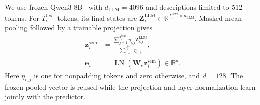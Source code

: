 \documentclass[journal]{IEEEtran}
\begin{document}
We use frozen Qwen3-8B~\cite{qwen2025technicalreport} with $d_{\mathrm{LLM}}=4096$ and descriptions limited to 512 tokens. For $T_i^{\mathrm{text}}$ tokens, its final states are $\mathbf Z_i^{\mathrm{LLM}}\in\mathbb R^{T_i^{\mathrm{text}}\times d_{\mathrm{LLM}}}$. Masked mean pooling followed by a trainable projection gives
\begin{equation}
\label{eq:semantic-representation}
\begin{aligned}
\mathbf z_i^{\mathrm{sem}}
&=\frac{\sum_{j=1}^{T_i^{\mathrm{text}}}\eta_{i,j}\mathbf Z_{i,j}^{\mathrm{LLM}}}
{\sum_{j=1}^{T_i^{\mathrm{text}}}\eta_{i,j}},\\
\mathbf e_i&=\operatorname{LN}(\mathbf W_e\mathbf z_i^{\mathrm{sem}})
\in\mathbb R^d.
\end{aligned}
\end{equation}
Here $\eta_{i,j}$ is one for nonpadding tokens and zero otherwise, and $d=128$. The frozen pooled vector is reused while the projection and layer normalization learn jointly with the predictor.


%
%
%
\end{document}
